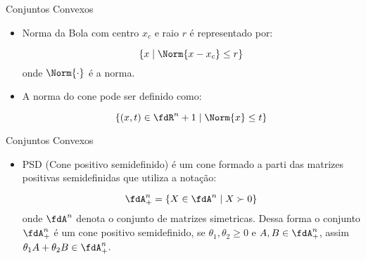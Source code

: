 \begin{frame}{Conjuntos Convexos}
  
  \begin{itemize}
    \item Norma da Bola com centro $x_{c}$ e raio $r$ é representado por:
    
    \begin{equation}\label{eq_norm_ball}
    \{ x \mid \Norm{x-x_c} \leq r \}
    \end{equation}
    onde $\Norm{\cdot}$ é a norma.
    
    \item A norma do cone pode ser definido como:
    
    \begin{equation}\label{eq_norm_cone}
    \{ (x,t) \in  \fdR^n+1 \mid \Norm{x} \leq t \}
    \end{equation}
  \end{itemize}
  
\end{frame}



\begin{frame}{Conjuntos Convexos}
  
  \begin{itemize}
    \item PSD (Cone positivo semidefinido) é um cone formado a parti das matrizes positivas semidefinidas que utiliza a notação:
    
    \begin{equation}\label{eq_psd}
    \fdA^n_+ = \{ X \in \fdA^n \mid X \succ 0 \}
    \end{equation}
    onde $\fdA^n$ denota o conjunto de matrizes simetricas. Dessa forma o conjunto $\fdA^n_+$ é um cone positivo 
    semidefinido, se $ \theta_{1}, \theta_{2} \geqslant 0$ e $A, B \in \fdA^n_+$, assim $ \theta_{1} A + \theta_{2} B 
    \in \fdA^n_+$.  
  \end{itemize}
\end{frame}



